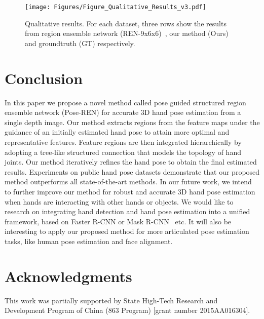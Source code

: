 \documentclass[final, 5p]{elsarticle}
\begin{document}
\begin{figure*}[!htb]
\centering
\centerline{\texttt{[image: Figures/Figure\_Qualitative\_Results\_v3.pdf]}}
\caption{Qualitative results. For each dataset, three rows show the results from region ensemble network (REN-9x6x6)~\cite{wang2018region}, our method (Ours) and groundtruth (GT) respectively.}
\label{fig:qualitative-results}
\end{figure*}

\section{Conclusion}
\label{sec:conclusion}
In this paper we propose a novel method called pose guided structured region ensemble network (Pose-REN) for accurate 3D hand pose estimation from a single depth image. Our method extracts regions from the feature maps under the guidance of an initially estimated hand pose to attain more optimal and representative features. Feature regions are then integrated hierarchically by adopting a tree-like structured connection that models the topology of hand joints. Our method iteratively refines the hand pose to obtain the final estimated results. Experiments on public hand pose datasets demonstrate that our proposed method outperforms all state-of-the-art methods.
In our future work, we intend to further improve our method for robust and accurate 3D hand pose estimation when hands are interacting with other hands or objects. We would like to research on integrating hand detection and hand pose estimation into a unified framework, based on Faster R-CNN\cite{ren2015faster} or Mask R-CNN~\cite{he2017mask} etc. It will also be interesting to apply our proposed method for more articulated pose estimation tasks, like human pose estimation and face alignment.

\section*{Acknowledgments}
This work was partially supported by State High-Tech Research and Development Program of China (863 Program) [grant number 2015AA016304].


\end{document}
